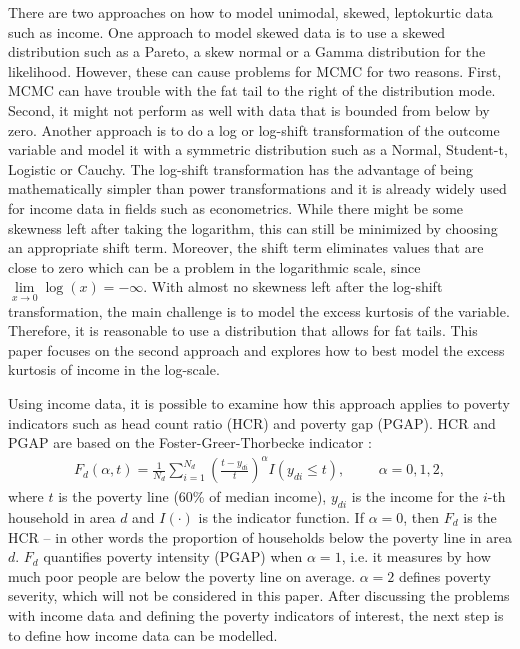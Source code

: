 There are two approaches on how to model unimodal, skewed, leptokurtic data such as income. One approach to model skewed data is to use a skewed distribution such as a Pareto, a skew normal or a Gamma distribution for the likelihood. However, these can cause problems for MCMC for two reasons. First, MCMC can have trouble with the fat tail to the right of the distribution mode. Second, it might not perform as well with data that is bounded from below by zero. Another approach is to do a log or log-shift transformation of the outcome variable and model it with a symmetric distribution such as a Normal, Student-t, Logistic or Cauchy.
The log-shift transformation has the advantage of being mathematically simpler than power transformations and it is already widely used for income data in fields such as econometrics. While there might be some skewness left after taking the logarithm, this can still be minimized by choosing an appropriate shift term. Moreover, the shift term eliminates values that are close to zero which can be a problem in the logarithmic scale, since $\underset{x \rightarrow 0}\lim \log(x) = -\infty$. With almost no skewness left after the log-shift transformation, the main challenge is to model the excess kurtosis of the variable. Therefore, it is reasonable to use a distribution that allows for fat tails. This paper focuses on the second approach and explores how to best model the excess kurtosis of income in the log-scale.

Using income data, it is possible to examine how this approach applies to poverty indicators such as head count ratio (HCR) and poverty gap (PGAP). HCR and PGAP are based on the Foster-Greer-Thorbecke indicator \citep{foster_class_1984}:
\begin{gather*}
   F_d(\alpha, t) = \displaystyle \frac 1 {N_d} \sum_{i=1}^{N_d}\left( \frac{t - y_{di}}{t} \right)^\alpha I (y_{di} \le t),
   \hspace{1cm}\alpha = 0, 1, 2,
\end{gather*}
where $t$ is the poverty line (60\% of median income), $y_{di}$ is the income for the $i$-th household in area $d$ and $I(\cdot)$ is the indicator function. If $\alpha = 0$, then $F_d$ is the HCR – in other words the proportion of households below the poverty line in area $d$. $F_d$ quantifies poverty intensity (PGAP) when $\alpha = 1$, i.e. it measures by how much poor people are below the poverty line on average. $\alpha = 2$ defines poverty severity, which will not be considered in this paper. After discussing the problems with income data and defining the poverty indicators of interest, the next step is to define how income data can be modelled.




